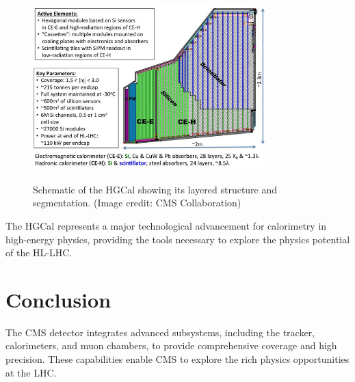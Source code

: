 \begin{figure}[h]
    \centering
    \includegraphics[width=0.8\textwidth]{Figures/HGCal.jpg}
    \caption{Schematic of the HGCal showing its layered structure and segmentation. (Image credit: CMS Collaboration)} \cite{HGCal}
    \label{fig:hgcal}
\end{figure}

The HGCal represents a major technological advancement for calorimetry in high-energy physics, providing the tools necessary to explore the physics potential of the HL-LHC.


\section{Conclusion}
The CMS detector integrates advanced subsystems, including the tracker, calorimeters, and muon chambers, to provide comprehensive coverage and high precision. These capabilities enable CMS to explore the rich physics opportunities at the LHC.
